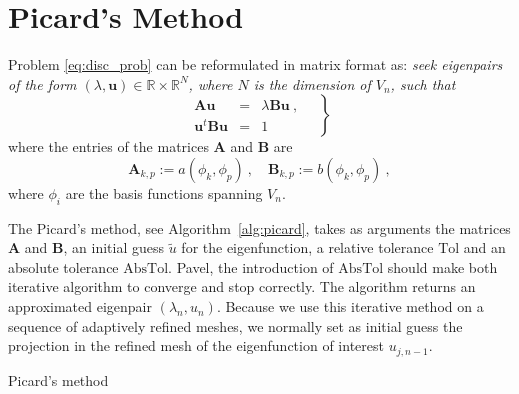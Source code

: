 \documentclass[preprint,12pt]{elsarticle}
\begin{document}

\section{Picard's Method}\label{sec:picard}

Problem \eqref{eq:disc_prob} can be reformulated in matrix format as:
\emph{seek eigenpairs of the form $(\lambda,\mathbf{u})\in
\mathbb{R}\times \mathbb{R}^N$, where $N$ is the dimension of $V_n$,
such that}
\begin{equation}
\label{eq:disc_prob_mat}
\left.
\begin{array}{lcl}
\mathbf{A} \mathbf{u}&=& \lambda\mathbf{B}\mathbf{u}\ ,
\\
\mathbf{u}^t\mathbf{B} \mathbf{u} &=& 1
\end{array}\quad
\right\}
\end{equation}
where the entries of the matrices $\mathbf{A}$ and $\mathbf{B}$ are 
$$
\mathbf{A}_{k,p}:=a(\phi_k,\phi_p)\ ,\quad\mathbf{B}_{k,p}:=b(\phi_k,\phi_p)\ ,
$$
where $\phi_i$ are the basis functions spanning $V_n$.

The Picard's method, see Algorithm~\ref{alg:picard}, takes as arguments the matrices $\mathbf{A}$ and $\mathbf{B}$, an initial guess $\tilde u$ for the eigenfunction, a relative tolerance $\mathrm{Tol}$ and an absolute tolerance $\mathrm{AbsTol}$. {\red Pavel, the introduction of $\mathrm{AbsTol}$ should make both iterative algorithm to converge and stop correctly.} The algorithm returns an approximated eigenpair $(\lambda_{n},u_{n})$.
Because we use this iterative method on a sequence of adaptively refined meshes, we normally set as initial guess
the projection in the refined mesh of the eigenfunction of interest $u_{j,n-1}$.

\begin{algorithm}[H] \caption{Picard's method} \label{alg:picard} 
\begin{algorithmic}


\REPEAT

\end{algorithmic}
\end{algorithm}
\end{document}
